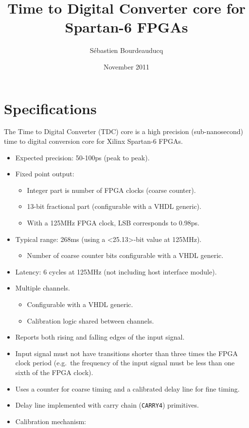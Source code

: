 \documentclass[a4paper,11pt]{article}
\title{Time to Digital Converter core for Spartan-6 FPGAs}
\author{S\'ebastien Bourdeauducq}
\date{November 2011}
\begin{document}
\setlength{\parindent}{0pt}
\setlength{\parskip}{5pt}
\maketitle{}
\section{Specifications}
The Time to Digital Converter (TDC) core is a high precision (sub-nanosecond) time to digital conversion core for Xilinx Spartan-6 FPGAs.

\begin{itemize}
\item Expected precision: 50-100ps (peak to peak).
\item Fixed point output:
\begin{itemize}
\item Integer part is number of FPGA clocks (coarse counter).
\item 13-bit fractional part (configurable with a VHDL generic).
\item With a 125MHz FPGA clock, LSB corresponds to 0.98ps.
\end{itemize}
\item Typical range: 268ms (using a <25.13>-bit value at 125MHz).
\begin{itemize}
\item Number of coarse counter bits configurable with a VHDL generic.
\end{itemize}
\item Latency: 6 cycles at 125MHz (not including host interface module).
\item Multiple channels.
\begin{itemize}
\item Configurable with a VHDL generic.
\item Calibration logic shared between channels.
\end{itemize}
\item Reports both rising and falling edges of the input signal.
\item Input signal must not have transitions shorter than three times the FPGA clock period (e.g.\ the frequency of the input signal must be less than one sixth of the FPGA clock).
\item Uses a counter for coarse timing and a calibrated delay line for fine timing.
\item Delay line implemented with carry chain (\verb!CARRY4!) primitives.
\item Calibration mechanism:

\end{itemize}
\end{document}

